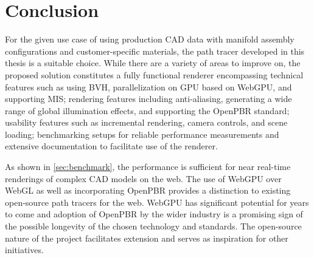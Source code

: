 \section{Conclusion}

For the given use case of using production \gls{CAD} data with manifold assembly configurations and customer-specific materials, the path tracer developed in this thesis is a suitable choice. While there are a variety of areas to improve on, the proposed solution constitutes a fully functional renderer encompassing technical features such as using \gls{BVH}, parallelization on \gls{GPU} based on \gls{WebGPU}, and supporting \gls{MIS}; rendering features including anti-aliasing, generating a wide range of global illumination effects, and supporting the \gls{OpenPBR} standard; usability features such as incremental rendering, camera controls, and scene loading; benchmarking setups for reliable performance measurements and extensive documentation to facilitate use of the renderer.

As shown in \autoref{sec:benchmark}, the performance is sufficient for near real-time renderings of complex \gls{CAD} models on the web. The use of \gls{WebGPU} over \gls{WebGL} as well as incorporating \gls{OpenPBR} provides a distinction to existing open-source path tracers for the web. \gls{WebGPU} has significant potential for years to come and adoption of \gls{OpenPBR} by the wider industry is a promising sign of the possible longevity of the chosen technology and standards. The open-source nature of the project facilitates extension and serves as inspiration for other initiatives.

